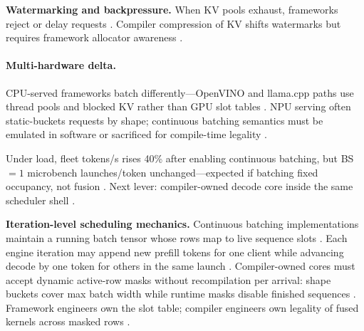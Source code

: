\textbf{Watermarking and backpressure.} When KV pools exhaust, frameworks reject or delay requests \citep{kwon2023vllm,patel2025llminference,memoryfloor2026,dlbook,yirage2026,chen2020compilerbasedhardw,taxbreak2026,liu2024deepseekv3,dao2022flashattention,dao2023flashdecoding,nvidia2024cudagraphs,semianalysis2024tma,amd2024xdna,amd2024aie,nvidia2022hopper,dlbook}. Compiler compression of KV shifts watermarks but requires framework allocator awareness \citep{liu2024deepseekv3,patel2025llminference,kwon2023vllm,yirage2026,chen2020compilerbasedhardw,memoryfloor2026,taxbreak2026,dlbook}.

\paragraph{Multi-hardware delta.} CPU-served frameworks batch differently---OpenVINO and llama.cpp paths use thread pools and blocked KV rather than GPU slot tables \citep{dlbook,amd2024aie,patel2025llminference,yirage2026,chen2020compilerbasedhardw}. NPU serving often static-buckets requests by shape; continuous batching semantics must be emulated in software or sacrificed for compile-time legality \citep{amd2024xdna,amd2024aie,chen2020compilerbasedhardw,yirage2026,patel2025llminference,kwon2023vllm,taxbreak2026,memoryfloor2026}.

\begin{example}
Under load, fleet tokens/s rises 40\% after enabling continuous batching, but BS${=}1$ microbench launches/token unchanged---expected if batching fixed occupancy, not fusion \citep{kwon2023vllm,taxbreak2026,patel2025llminference,memoryfloor2026,yirage2026}. Next lever: compiler-owned decode core inside the same scheduler shell \citep{yirage2026,chen2020compilerbasedhardw,nvidia2024cudagraphs}.
\end{example}

\textbf{Iteration-level scheduling mechanics.} Continuous batching implementations maintain a running batch tensor whose rows map to live sequence slots \citep{kwon2023vllm,patel2025llminference,dlbook,memoryfloor2026,taxbreak2026,yirage2026,chen2020compilerbasedhardw,liu2024deepseekv3,nvidia2024cudagraphs,dao2022flashattention,semianalysis2024tma,amd2024xdna,amd2024aie,dlbook}. Each engine iteration may append new prefill tokens for one client while advancing decode by one token for others in the same launch \citep{kwon2023vllm,patel2025llminference,memoryfloor2026,dlbook,yirage2026,chen2020compilerbasedhardw,taxbreak2026,liu2024deepseekv3,nvidia2024cudagraphs,dao2022flashattention,dao2023flashdecoding,semianalysis2024tma,amd2024aie,amd2024xdna,dlbook}. Compiler-owned cores must accept dynamic active-row masks without recompilation per arrival: shape buckets cover max batch width while runtime masks disable finished sequences \citep{yirage2026,chen2020compilerbasedhardw,nvidia2024cudagraphs,kwon2023vllm,patel2025llminference,memoryfloor2026,taxbreak2026,dao2022flashattention,liu2024deepseekv3,semianalysis2024tma,dlbook,amd2024xdna,amd2024aie,dao2023flashdecoding,nvidia2022hopper,dlbook}. Framework engineers own the slot table; compiler engineers own legality of fused kernels across masked rows \citep{patel2025llminference,yirage2026,chen2020compilerbasedhardw,kwon2023vllm,taxbreak2026,memoryfloor2026,dlbook}.


